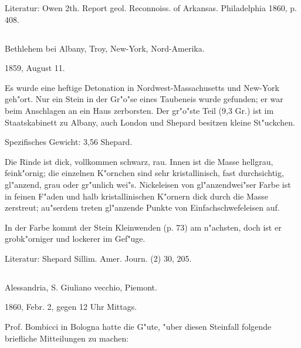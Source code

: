 \documentclass[a4paper, 11pt, oneside]{article}
\begin{document}
\normalsize
Literatur: Owen 2th. Report geol. Reconnoiss. of Arkansas. Philadelphia 1860, p. 408.

\subsection{}
\LARGE
\paragraph{}
Bethlehem bei Albany, Troy, New-York, Nord-Amerika.

1859, August 11.

Es wurde eine heftige Detonation in Nordwest-Massachusetts und New-York geh"ort. Nur ein Stein in der Gr"o"se eines Taubeneis wurde gefunden; er war beim Anschlagen an ein Haus zerborsten. Der gr"o"ste Teil (9,3 Gr.) ist im Staatskabinett zu Albany, auch London und Shepard besitzen kleine St"uckchen.

Spezifisches Gewicht: 3,56 Shepard.

Die Rinde ist dick, vollkommen schwarz, rau. Innen ist die Masse hellgrau, feink"ornig; die einzelnen K"ornchen sind sehr kristallinisch, fast durchsichtig, gl"anzend, grau oder gr"unlich wei"s. Nickeleisen von gl"anzendwei"ser Farbe ist in feinen F"aden und halb kristallinischen K"ornern dick durch die Masse zerstreut; au"serdem treten gl"anzende Punkte von Einfachschwefeleisen auf.

In der Farbe kommt der Stein Kleinwenden (p. 73) am n"achsten, doch ist er grobk"orniger und lockerer im Gef"uge.

Literatur: Shepard Sillim. Amer. Journ. (2) 30, 205.

\subsection{}
\LARGE
\paragraph{}
Alessandria, S. Giuliano vecchio, Piemont.

1860, Febr. 2, gegen 12 Uhr Mittags.

Prof. Bombicci in Bologna hatte die G"ute, "uber diesen Steinfall folgende briefliche Mitteilungen zu machen:
\end{document}
